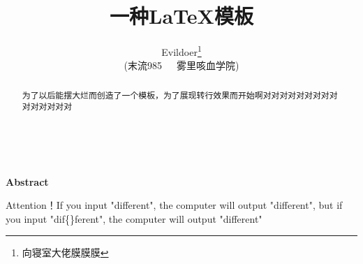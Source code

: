 \documentclass[12pt,a4paper]{article}%
\title{\fontsize{18pt}{27pt}\selectfont%
	{\heiti%
		一种\LaTeX 模板}}%
\author{\fontsize{12pt}{18pt}\selectfont%
	{\fangsong%
		Evildoer}\thanks{向寝室大佬膜膜膜}\\%
	\fontsize{10.5pt}{15.75pt}\selectfont%
	{\fangsong%
		(末流985~~~雾里咳血学院)}}%
\date{}%
\begin{document}
	\maketitle%


	\lhead{}%
	\chead{}%
	\rhead{}%
	\lfoot{}%
	\cfoot{\thepage}%
	\rfoot{}%


	\begin{abstract}
		\fangsong 为了以后能摆大烂而创造了一个模板，为了展现转行效果而开始啊对对对对对对对对对对对对对对对
	\end{abstract}
	
	\begin{adjustwidth}{1.06cm}{1.06cm}
		\fontsize{10.5pt}{15.75pt}\\
	\end{adjustwidth}
	
	\begin{center}%
		{\textbf{Abstract}}%
	\end{center}
	\begin{adjustwidth}{1.06cm}{1.06cm}%
		\hspace{1.5em}Attention！If you input "dif{}ferent", the computer will output "different", but if you input "dif\{\}ferent", the computer will output "dif{}ferent"
	\end{adjustwidth}
	\newpage%
\end{document}
